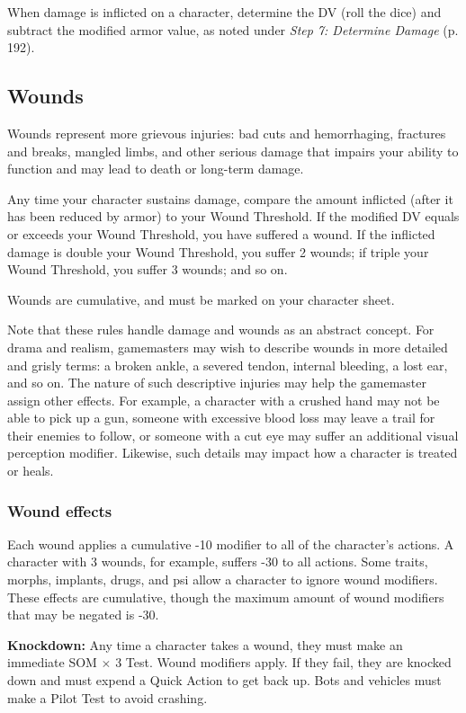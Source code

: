 When damage is inflicted on a character, determine the DV (roll the dice) and subtract the modified armor value, as noted under \emph{Step 7: Determine Damage} (p. 192). 

\subsection{Wounds} \label{sec:wounds} 

Wounds represent more grievous injuries: bad cuts and hemorrhaging, fractures and breaks, mangled limbs, and other serious damage that impairs your ability to function and may lead to death or long-term damage. 

Any time your character sustains damage, compare the amount inflicted (after it has been reduced by armor) to your Wound Threshold. If the modified DV equals or exceeds your Wound Threshold, you have suffered a wound. If the inflicted damage is double your Wound Threshold, you suffer 2 wounds; if triple your Wound Threshold, you suffer 3 wounds; and so on. 

Wounds are cumulative, and must be marked on your character sheet. 

Note that these rules handle damage and wounds as an abstract concept. For drama and realism, gamemasters may wish to describe wounds in more detailed and grisly terms: a broken ankle, a severed tendon, internal bleeding, a lost ear, and so on. The nature of such descriptive injuries may help the gamemaster assign other effects. For example, a character with a crushed hand may not be able to pick up a gun, someone with excessive blood loss may leave a trail for their enemies to follow, or someone with a cut eye may suffer an additional visual perception modifier. Likewise, such details may impact how a character is treated or heals. 

\subsubsection{Wound effects} 

Each wound applies a cumulative -10 modifier to all of the character’s actions. A character with 3 wounds, for example, suffers -30 to all actions. Some traits, morphs, implants, drugs, and psi allow a character to ignore wound modifiers. These effects are cumulative, though the maximum amount of wound modifiers that may be negated is -30. 

\textbf{Knockdown:} Any time a character takes a wound, they must make an immediate SOM $\times$ 3 Test. Wound modifiers apply. If they fail, they are knocked down and must expend a Quick Action to get back up. Bots and vehicles must make a Pilot Test to avoid crashing. 

